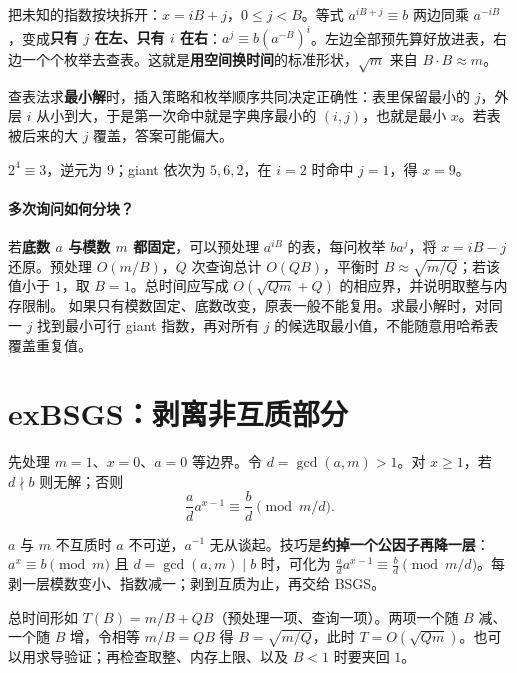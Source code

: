\documentclass[UTF8,a4paper,11pt,twoside,openright,fontset=fandol]{ctexbook}
\theoremstyle{definition}
\begin{document}
\begin{tip}
把未知的指数按块拆开：$x=iB+j$，$0\le j<B$。等式 $a^{iB+j}\equiv b$ 两边同乘 $a^{-iB}$，变成\textbf{只有 $j$ 在左、只有 $i$ 在右}：$a^j\equiv b(a^{-B})^i$。左边全部预先算好放进表，右边一个个枚举去查表。这就是\textbf{用空间换时间}的标准形状，$\sqrt m$ 来自 $B\cdot B\approx m$。
\end{tip}

\begin{tip}
查表法求\textbf{最小解}时，插入策略和枚举顺序共同决定正确性：表里保留最小的 $j$，外层 $i$ 从小到大，于是第一次命中就是字典序最小的 $(i,j)$，也就是最小 $x$。若表被后来的大 $j$ 覆盖，答案可能偏大。
\end{tip}

$2^4\equiv3$，逆元为 $9$；giant 依次为 $5,6,2$，在 $i=2$ 时命中 $j=1$，得 $x=9$。

\paragraph{多次询问如何分块？}
若\textbf{底数 $a$ 与模数 $m$ 都固定}，可以预处理 $a^{iB}$ 的表，每问枚举 $ba^j$，将 $x=iB-j$ 还原。预处理 $O(m/B)$，$Q$ 次查询总计 $O(QB)$，平衡时 $B\approx\sqrt{m/Q}$；若该值小于 $1$，取 $B=1$。总时间应写成 $O(\sqrt{Qm}+Q)$ 的相应界，并说明取整与内存限制。
如果只有模数固定、底数改变，原表一般不能复用。求最小解时，对同一 $j$ 找到最小可行 giant 指数，再对所有 $j$ 的候选取最小值，不能随意用哈希表覆盖重复值。


\section{exBSGS：剥离非互质部分}
先处理 $m=1$、$x=0$、$a=0$ 等边界。令 $d=\gcd(a,m)>1$。对 $x\ge1$，若 $d\nmid b$ 则无解；否则
\[
 \frac ad a^{x-1}\equiv\frac bd\pmod{m/d}.
\]

\begin{tip}
$a$ 与 $m$ 不互质时 $a$ 不可逆，$a^{-1}$ 无从谈起。技巧是\textbf{约掉一个公因子再降一层}：$a^x\equiv b\pmod m$ 且 $d=\gcd(a,m)\mid b$ 时，可化为 $\frac ad a^{x-1}\equiv\frac b d\pmod{m/d}$。每剥一层模数变小、指数减一；剥到互质为止，再交给 BSGS。
\end{tip}

\begin{tip}
总时间形如 $T(B)=m/B+QB$（预处理一项、查询一项）。两项一个随 $B$ 减、一个随 $B$ 增，令相等 $m/B=QB$ 得 $B=\sqrt{m/Q}$，此时 $T=O(\sqrt{Qm})$。也可以用求导验证；再检查取整、内存上限、以及 $B<1$ 时要夹回 $1$。
\end{tip}
\end{document}
